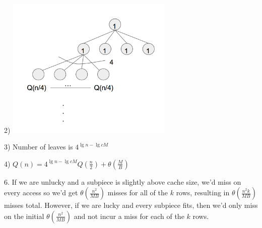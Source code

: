 \documentclass{article}
\begin{document}
2) \includegraphics[width=8cm]{tree}

3) Number of leaves is $4^{\lg{n}-\lg{cM}}$

4) $Q(n) = 4^{\lg{n}-\lg{cM}}Q(\frac{n}{2}) + \theta(\frac{M}{B})$

6. If we are unlucky and a subpiece is slightly above cache size, we'd miss on every access so we'd get $\theta(\frac{n^2}{MB})$ misses for all of the $k$ rows, resulting in $\theta(\frac{n^2k}{MB})$ misses total. However, if we are lucky and every subpiece fits, then we'd only miss on the initial $\theta(\frac{n^2}{MB})$ and not incur a miss for each of the $k$ rows.
\end{document}
